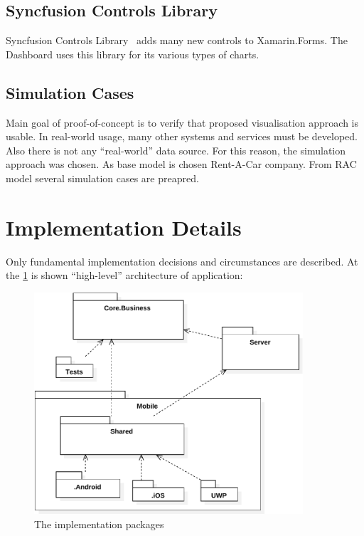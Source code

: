 \subsection{Syncfusion Controls Library}
Syncfusion Controls Library~\cite{syncfusion} adds many new controls to Xamarin.Forms. The Dashboard uses this library for its various types of charts. 
\subsection{Simulation Cases}
Main goal of proof-of-concept is to verify that proposed visualisation approach is usable. In real-world usage, many other systems and services must be developed. Also there is not any ``real-world'' data source. For this reason, the simulation approach was chosen. As base model is chosen Rent-A-Car company. From RAC model several simulation cases are preapred.
\section{Implementation Details}
Only fundamental implementation decisions and circumstances are described. At the \cref{fig:impl-dependecies-graph} is shown ``high-level'' architecture of application:

\begin{figure}[ht!]
\centering
\includegraphics[width=10cm,keepaspectratio]{img/dependecies-graph}
\caption{The implementation packages}
\label{fig:impl-dependecies-graph}
\end{figure}

